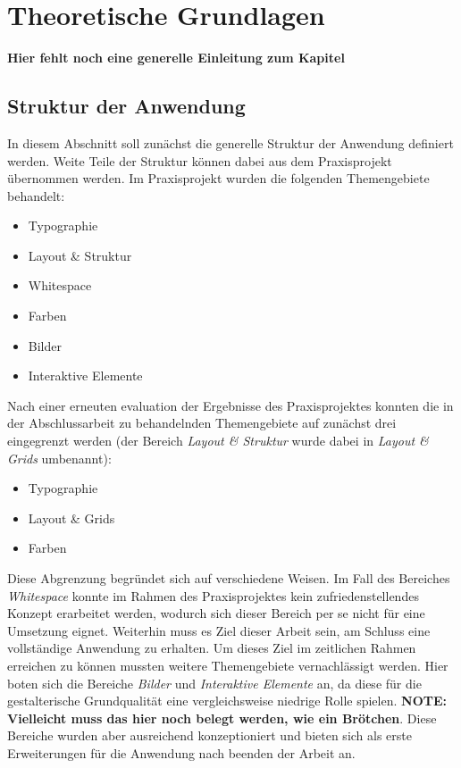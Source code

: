 \chapter{Theoretische Grundlagen}
\thispagestyle{fancy}
\textbf{Hier fehlt noch eine generelle Einleitung zum Kapitel}

\section{Struktur der Anwendung}
In diesem Abschnitt soll zunächst die generelle Struktur der Anwendung definiert werden. Weite Teile der Struktur können dabei aus dem Praxisprojekt übernommen werden. Im Praxisprojekt wurden die folgenden Themengebiete behandelt:

\begin{itemize}
  \item Typographie
  \item Layout \& Struktur
  \item Whitespace
  \item Farben
  \item Bilder
  \item Interaktive Elemente
\end{itemize}

Nach einer erneuten evaluation der Ergebnisse des Praxisprojektes konnten die in der Abschlussarbeit zu behandelnden Themengebiete auf zunächst drei eingegrenzt werden (der Bereich \textit{Layout \& Struktur} wurde dabei in \textit{Layout \& Grids} umbenannt):

\begin{itemize}
  \item Typographie
  \item Layout \& Grids
  \item Farben
\end{itemize}

Diese Abgrenzung begründet sich auf verschiedene Weisen. Im Fall des Bereiches \textit{Whitespace} konnte im Rahmen des Praxisprojektes kein zufriedenstellendes Konzept erarbeitet werden, wodurch sich dieser Bereich per se nicht für eine Umsetzung eignet. Weiterhin muss es Ziel dieser Arbeit sein, am Schluss eine vollständige Anwendung zu erhalten. Um dieses Ziel im zeitlichen Rahmen erreichen zu können mussten weitere Themengebiete vernachlässigt werden. Hier boten sich die Bereiche \textit{Bilder} und \textit{Interaktive Elemente} an, da diese für die gestalterische Grundqualität eine vergleichsweise niedrige Rolle spielen. \textbf{NOTE: Vielleicht muss das hier noch belegt werden, wie ein Brötchen}. Diese Bereiche wurden aber ausreichend konzeptioniert und bieten sich als erste Erweiterungen für die Anwendung nach beenden der Arbeit an.

